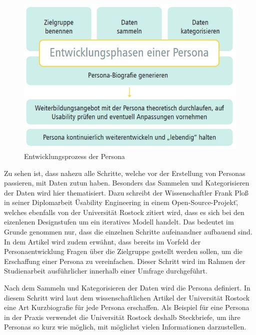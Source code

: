 \begin{figure}[h]
    \centering
    \includegraphics[width=1\textwidth]{images/03/entwicklungPersona.jpg}
    \caption{Entwicklungsprozess der Persona \cite{personamethode}}
    \label{personaEntwicklungsPhasen}
\end{figure}

Zu sehen ist, dass nahezu alle Schritte, welche vor der Erstellung von Personas passieren, mit Daten zutun haben. Besonders das Sammelen und Kategorisieren der Daten wird hier thematisiert.\cite{personamethode} Dazu schreibt der Wissenschaftler Frank Ploß in seiner Diplomarbeit \"Usability Engineering in einem Open-Source-Projekt\", welches ebenfalls von der Universität Rostock zitiert wird, dass es sich bei den eizenlenen Designstufen um ein iteratives Modell handelt.\cite{osp:masterthesis}
Das bedeutet im Grunde genommen nur, dass die einzelnen Schritte aufeinandner aufbauend sind. In dem Artikel wird zudem erwähnt, dass bereits im Vorfeld der Personaentwicklung Fragen über die Zielgruppe gestellt werden sollen, um die Erschaffung einer Persona zu vereinfachen.\cite{personamethode}
Dieser Schritt wird im Rahmen der Studienarbeit ausführlicher innerhalb einer Umfrage durchgeführt.

Nach dem Sammeln und Kategorisieren der Daten wird die Persona definiert.\cite{personamethode} In diesem Schritt wird laut dem wissenschaftlichen Artikel der Universität Rostock eine Art Kurzbiografie für jede Persona erschaffen.\cite{personamethode} Als Beispiel für eine Persona in der Praxis verwendet die Universität Rostock deshalb Steckbriefe, um ihre Personas so kurz wie möglich, mit möglichst vielen Informationen darzustellen.\cite{personamethode}

